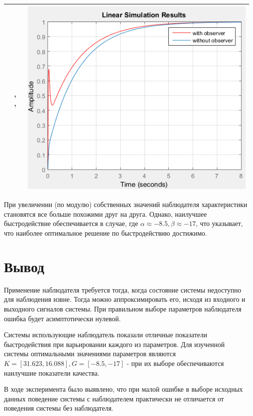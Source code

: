 \documentclass[14pt,a4paper,report]{report}
\begin{document}
\begin{table}[h!]
\begin{tabular}{ | m{4cm} | m{4cm} | m{8cm} | }
		\text{$k_0=31.623$, $k_1=16.088$}\linebreak \text{$\alpha=-16$, $\beta=-32$, $\gamma=0.2$} & 
		\text{С наблюдателем:}\linebreak
		\text{$\Omega=5.6234$}, \text{$min(|Re(p_{1-4})|)=0.7846$}
		\text{Без наблюдателя:}\linebreak
		\text{$\Omega=5.6234$}, \text{$min(|Re(p_{1-2})|)=0.7846$} & 
		\begin{minipage}{.3\textwidth}
			\includegraphics[scale = 0.46]{images/g3.png}
		\end{minipage}
		\\\hline
		
	\end{tabular}
	\egroup
\end{table}

При увеличении (по модулю) собственных значений наблюдателя характеристики становятся все больше похожими друг на друга. Однако, наилучшее быстродействие обеспечивается в случае, где $\alpha\approx-8.5, \beta\approx-17$, что указывает, что наиболее оптимальное решение по быстродействию достижимо.

\section{Вывод}

Применение наблюдателя требуется тогда, когда состояние системы недоступно для наблюдения извне. Тогда можно аппроксимировать его, исходя из входного и выходного сигналов системы. При правильном выборе параметров наблюдателя ошибка будет асимптотически нулевой.

Системы использующие наблюдатель показали отличные показатели быстродействия при варьировании каждого из параметров. Для изученной системы оптимальными значениями параметров являются $K=[31.623, 16.088], G=[-8.5, -17]$ - при их выборе обеспечиваются наилучшие показатели качества.

В ходе эксперимента было выявлено, что при малой ошибке в выборе исходных данных поведение системы с наблюдателем практически не отличается от поведения системы без наблюдателя.
\end{document}
